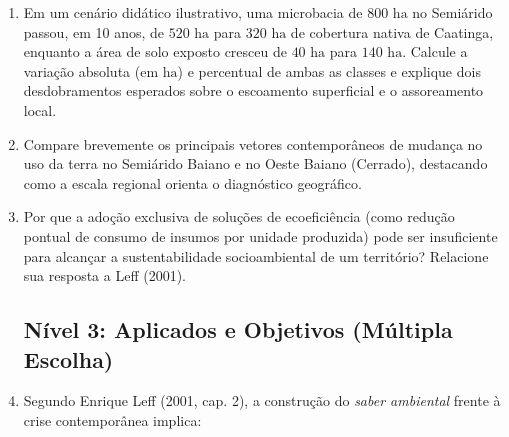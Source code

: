 \begin{enumerate}[leftmargin=1.8em, itemsep=4pt]
  \item Em um cenário didático ilustrativo, uma microbacia de $800\text{ ha}$ no Semiárido passou, em 10 anos, de $520\text{ ha}$ para $320\text{ ha}$ de cobertura nativa de Caatinga, enquanto a área de solo exposto cresceu de $40\text{ ha}$ para $140\text{ ha}$. Calcule a variação absoluta (em $\text{ha}$) e percentual de ambas as classes e explique dois desdobramentos esperados sobre o escoamento superficial e o assoreamento local.
  \espacoResolucao[1.8cm]

  \item Compare brevemente os principais vetores contemporâneos de mudança no uso da terra no Semiárido Baiano e no Oeste Baiano (Cerrado), destacando como a escala regional orienta o diagnóstico geográfico.
  \espacoResolucao[1.8cm]

  \item Por que a adoção exclusiva de soluções de ecoeficiência (como redução pontual de consumo de insumos por unidade produzida) pode ser insuficiente para alcançar a sustentabilidade socioambiental de um território? Relacione sua resposta a Leff (2001).
  \espacoResolucao[1.8cm]

\subsection*{Nível 3: Aplicados e Objetivos (Múltipla Escolha)}

  \item Segundo Enrique Leff (2001, cap. 2), a construção do \emph{saber ambiental} frente à crise contemporânea implica:
  \espacoResolucao[1.8cm]


\end{enumerate}
